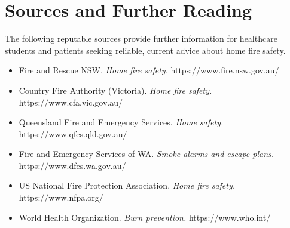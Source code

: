 \section*{Sources and Further Reading}
The following reputable sources provide further information for healthcare students and patients seeking reliable, current advice about home fire safety.
\begin{itemize}
    \item Fire and Rescue NSW. \textit{Home fire safety.} https://www.fire.nsw.gov.au/
    \item Country Fire Authority (Victoria). \textit{Home fire safety.} https://www.cfa.vic.gov.au/
    \item Queensland Fire and Emergency Services. \textit{Home safety.} https://www.qfes.qld.gov.au/
    \item Fire and Emergency Services of WA. \textit{Smoke alarms and escape plans.} https://www.dfes.wa.gov.au/
    \item US National Fire Protection Association. \textit{Home fire safety.} https://www.nfpa.org/
    \item World Health Organization. \textit{Burn prevention.} https://www.who.int/
\end{itemize}
